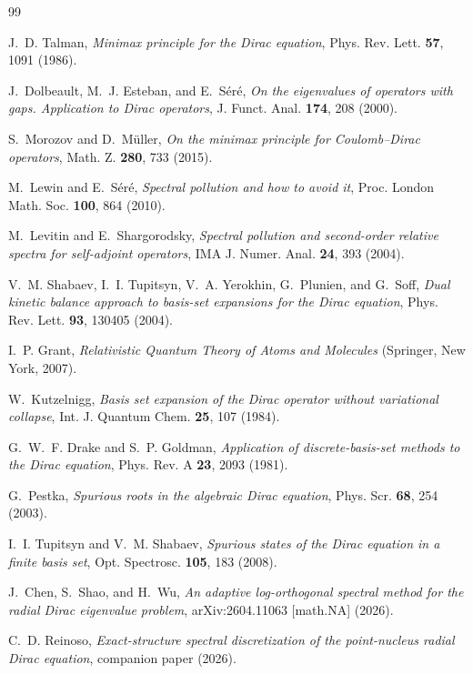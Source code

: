 \documentclass[11pt,reqno]{amsart}
\theoremstyle{definition}
\theoremstyle{remark}
\begin{document}
\begin{thebibliography}{99}

 J.~D. Talman,
\emph{Minimax principle for the Dirac equation},
Phys. Rev. Lett. \textbf{57}, 1091 (1986).

 J.~Dolbeault, M.~J. Esteban, and E.~S\'er\'e,
\emph{On the eigenvalues of operators with gaps. Application to Dirac
operators}, J. Funct. Anal. \textbf{174}, 208 (2000).

 S.~Morozov and D.~M\"uller,
\emph{On the minimax principle for Coulomb--Dirac operators},
Math. Z. \textbf{280}, 733 (2015).

 M.~Lewin and E.~S\'er\'e,
\emph{Spectral pollution and how to avoid it},
Proc. London Math. Soc. \textbf{100}, 864 (2010).

 M.~Levitin and E.~Shargorodsky,
\emph{Spectral pollution and second-order relative spectra for
self-adjoint operators}, IMA J. Numer. Anal. \textbf{24}, 393 (2004).

 V.~M. Shabaev, I.~I. Tupitsyn, V.~A. Yerokhin,
G.~Plunien, and G.~Soff,
\emph{Dual kinetic balance approach to basis-set expansions for the
Dirac equation}, Phys. Rev. Lett. \textbf{93}, 130405 (2004).

 I.~P. Grant,
\emph{Relativistic Quantum Theory of Atoms and Molecules}
(Springer, New York, 2007).

 W.~Kutzelnigg,
\emph{Basis set expansion of the Dirac operator without variational
collapse}, Int. J. Quantum Chem. \textbf{25}, 107 (1984).

 G.~W.~F. Drake and S.~P. Goldman,
\emph{Application of discrete-basis-set methods to the Dirac equation},
Phys. Rev. A \textbf{23}, 2093 (1981).

 G.~Pestka,
\emph{Spurious roots in the algebraic Dirac equation},
Phys. Scr. \textbf{68}, 254 (2003).

 I.~I. Tupitsyn and V.~M. Shabaev,
\emph{Spurious states of the Dirac equation in a finite basis set},
Opt. Spectrosc. \textbf{105}, 183 (2008).

 J.~Chen, S.~Shao, and H.~Wu,
\emph{An adaptive log-orthogonal spectral method for the radial Dirac
eigenvalue problem}, arXiv:2604.11063 [math.NA] (2026).

 C.~D. Reinoso,
\emph{Exact-structure spectral discretization of the point-nucleus
radial Dirac equation}, companion paper (2026).

\end{thebibliography}
\end{document}
